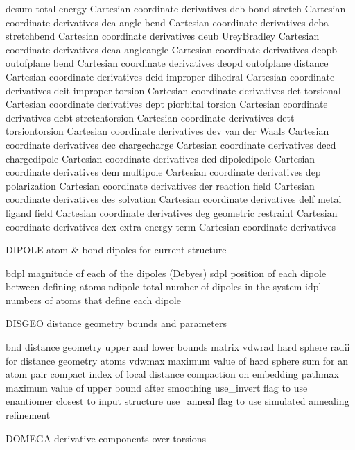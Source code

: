 \documentclass[letterpaper,11pt,english]{sphinxmanual}
\begin{document}
desum   total energy Cartesian coordinate derivatives
deb     bond stretch Cartesian coordinate derivatives
dea     angle bend Cartesian coordinate derivatives
deba    stretch\sphinxhyphen{}bend Cartesian coordinate derivatives
deub    Urey\sphinxhyphen{}Bradley Cartesian coordinate derivatives
deaa    angle\sphinxhyphen{}angle Cartesian coordinate derivatives
deopb   out\sphinxhyphen{}of\sphinxhyphen{}plane bend Cartesian coordinate derivatives
deopd   out\sphinxhyphen{}of\sphinxhyphen{}plane distance Cartesian coordinate derivatives
deid    improper dihedral Cartesian coordinate derivatives
deit    improper torsion Cartesian coordinate derivatives
det     torsional Cartesian coordinate derivatives
dept    pi\sphinxhyphen{}orbital torsion Cartesian coordinate derivatives
debt    stretch\sphinxhyphen{}torsion Cartesian coordinate derivatives
dett    torsion\sphinxhyphen{}torsion Cartesian coordinate derivatives
dev     van der Waals Cartesian coordinate derivatives
dec     charge\sphinxhyphen{}charge Cartesian coordinate derivatives
decd    charge\sphinxhyphen{}dipole Cartesian coordinate derivatives
ded     dipole\sphinxhyphen{}dipole Cartesian coordinate derivatives
dem     multipole Cartesian coordinate derivatives
dep     polarization Cartesian coordinate derivatives
der     reaction field Cartesian coordinate derivatives
des     solvation Cartesian coordinate derivatives
delf    metal ligand field Cartesian coordinate derivatives
deg     geometric restraint Cartesian coordinate derivatives
dex     extra energy term Cartesian coordinate derivatives

DIPOLE  atom \& bond dipoles for current structure

bdpl    magnitude of each of the dipoles (Debyes)
sdpl    position of each dipole between defining atoms
ndipole total number of dipoles in the system
idpl    numbers of atoms that define each dipole

DISGEO  distance geometry bounds and parameters

bnd     distance geometry upper and lower bounds matrix
vdwrad  hard sphere radii for distance geometry atoms
vdwmax  maximum value of hard sphere sum for an atom pair
compact index of local distance compaction on embedding
pathmax maximum value of upper bound after smoothing
use\_invert      flag to use enantiomer closest to input structure
use\_anneal      flag to use simulated annealing refinement

DOMEGA  derivative components over torsions
\end{document}
